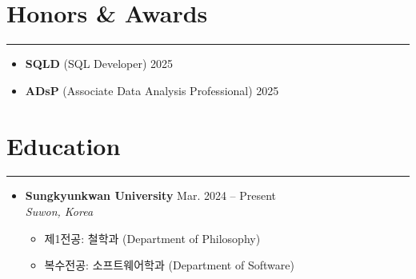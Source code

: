 \documentclass[letterpaper, 10pt]{article}
\begin{document}
\section*{Honors \& Awards}
\hrule
\vspace{4pt}
\begin{itemize}
    \item[] \textbf{SQLD} (SQL Developer) \hfill 2025
    \item[] \textbf{ADsP} (Associate Data Analysis Professional) \hfill 2025
\end{itemize}

\section*{Education}
\hrule
\vspace{4pt}
\begin{itemize}
    \item[]
        \textbf{Sungkyunkwan University} \hfill Mar. 2024 -- Present \\
        \textit{Suwon, Korea}
        \begin{itemize}
            \item 제1전공: 철학과 (Department of Philosophy)
            \item 복수전공: 소프트웨어학과 (Department of Software)
        \end{itemize}
\end{itemize}
\end{document}
